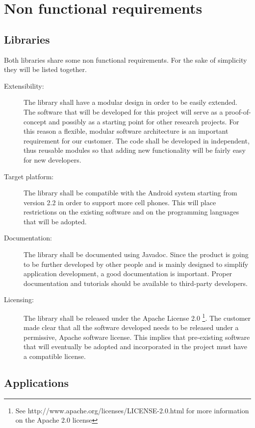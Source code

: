 \section{Non functional requirements}

\subsection{Libraries}

Both libraries share some non functional requirements.
For the sake of simplicity they will be listed together.

\begin{description}
	\item[Extensibility:] The library shall have a modular design
	in order to be easily extended. The software that will be developed for
	this project will serve as a proof-of-concept and possibly as a starting
	point for other research projects. For this reason a flexible, modular
	software architecture is an important requirement for our customer. The code
	shall be developed in independent, thus reusable modules so that adding new
	functionality will be fairly easy for new developers.
	\item[Target platform:] The library shall be compatible with the Android
	system starting from version 2.2 in order to support more cell phones. This will place restrictions on the
	existing software and on the programming languages that will be adopted.
	\item[Documentation:] The library shall be documented using Javadoc.
	Since the product is going to be further developed by other people and is
	mainly designed to simplify application development, a good documentation is
	important. Proper documentation and tutorials should be available to
	third-party developers.
	\item[Licensing:] The library shall be released under the Apache License 2.0
	\footnote{See http://www.apache.org/licenses/LICENSE-2.0.html for more
	information on the Apache 2.0 license}. The customer made clear that all the
	software developed needs to be released under a permissive, Apache software
	license. This implies that pre-existing software that will eventually be
	adopted and incorporated in the project must have a compatible license.
\end{description}

\subsection{Applications}


